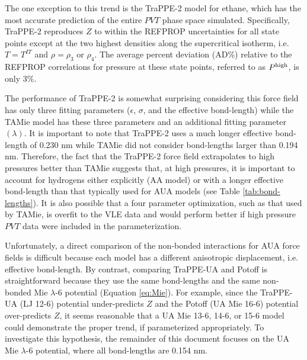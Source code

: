\documentclass[journal=jctc,manuscript=article]{achemso}
\begin{document}
The one exception to this trend is the TraPPE-2 model for ethane, which has the most accurate prediction of the entire $PVT$ phase space simulated. Specifically, TraPPE-2 reproduces $Z$ to within the REFPROP uncertainties for all state points except at the two highest densities along the supercritical isotherm, i.e. $T=T^{IT}$ and $\rho = \rho_3$ or $\rho_4$. The average percent deviation (AD\%) relative to the REFPROP correlations for pressure at these state points, referred to as $P^{\rm high}$, is only 3\%. 

The performance of TraPPE-2 is somewhat surprising considering this force field has only three fitting parameters ($\epsilon$, $\sigma$, and the effective bond-length) while the TAMie model has these three parameters and an additional fitting parameter $(\lambda)$. It is important to note that TraPPE-2 uses a much longer effective bond-length of 0.230 nm while TAMie did not consider bond-lengths larger than 0.194 nm. Therefore, the fact that the TraPPE-2 force field extrapolates to high pressures better than TAMie suggests that, at high pressures, it is important to account for hydrogens either explicitly (AA model) or with a longer effective bond-length than that typically used for AUA models (see Table \ref{tab:bond-lengths}). It is also possible that a four parameter optimization, such as that used by TAMie, is overfit to the VLE data and would perform better if high pressure $PVT$ data were included in the parameterization.

Unfortunately, a direct comparison of the non-bonded interactions for AUA force fields is difficult because each model has a different anisotropic displacement, i.e. effective bond-length. 
By contrast, 
comparing TraPPE-UA and Potoff is straightforward because they use the same bond-lengths and the same non-bonded Mie $\lambda$-6 potential (Equation \ref{eq:Mie}). For example, since the TraPPE-UA (LJ 12-6) potential under-predicts $Z$ and the Potoff (UA Mie 16-6) potential over-predicts $Z$, it seems reasonable that a UA Mie 13-6, 14-6, or 15-6 model 
could
demonstrate the proper trend, if parameterized appropriately. To investigate this hypothesis, the remainder of this document focuses on the UA Mie $\lambda$-6 potential, where all bond-lengths are 0.154 nm. 
\end{document}
